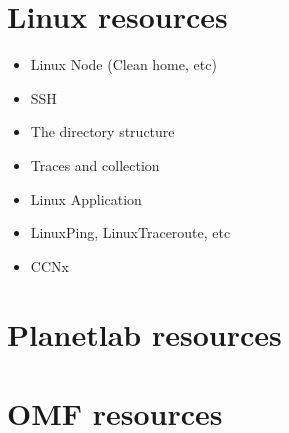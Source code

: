 %
%
%
%
%
%

\section{Linux resources}

\begin{itemize}
  \item Linux Node (Clean home, etc)
  \item SSH
  \item The directory structure
  \item Traces and collection
  \item Linux Application
  \item LinuxPing, LinuxTraceroute, etc
  \item CCNx
\end{itemize}

\section{Planetlab resources}



\section{OMF resources}


